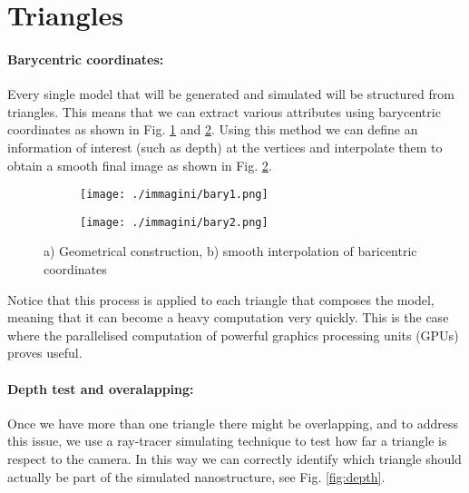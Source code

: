 \section{Triangles}

\paragraph{Barycentric coordinates: }

Every single model that will be generated and simulated will be structured from triangles. This means that we can extract various attributes using barycentric coordinates as shown in Fig. \ref{fig:bary_a} and \ref{fig:bary_b}. Using this method we can define an information of interest (such as depth) at the vertices and interpolate them to obtain a smooth final image as shown in Fig. \ref{fig:bary_b}.

\begin{figure}[ht]
    \centering
    \begin{subfigure}[b]{0.33\textwidth}
        \texttt{[image: ./immagini/bary1.png]}
        \caption{}
        \label{fig:bary_a}
    \end{subfigure}
    \hfill
    \begin{subfigure}[b]{0.33\textwidth}
        \texttt{[image: ./immagini/bary2.png]}
        \caption{}
        \label{fig:bary_b}
    \end{subfigure}
    \caption{a) Geometrical construction, b) smooth interpolation of baricentric coordinates}
    \label{fig:bary}
\end{figure}

Notice that this process is applied to each triangle that composes the model, meaning that it can become a heavy computation very quickly. This is the case where the parallelised computation of powerful graphics processing units (GPUs) proves useful.

\paragraph{Depth test and overalapping: }

Once we have more than one triangle there might be overlapping, and to address this issue, we use a ray-tracer simulating technique to test how far a triangle is respect to the camera. In this way we can correctly identify which triangle should actually be part of the simulated nanostructure, see Fig. \ref{fig:depth}.

